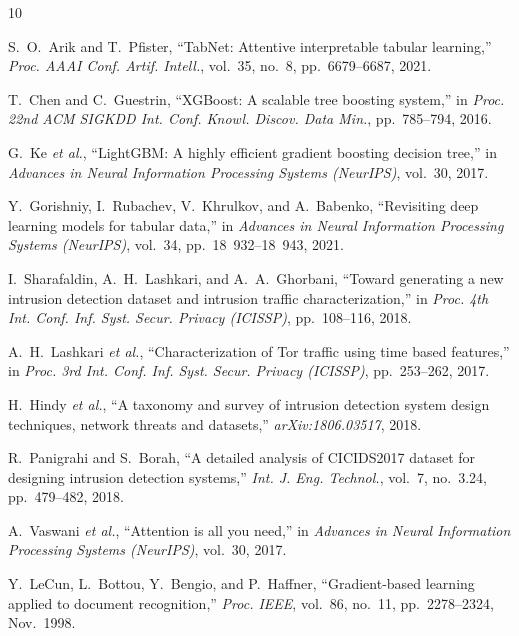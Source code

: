 \documentclass[conference]{IEEEtran}
\begin{document}
\balance
\begin{thebibliography}{10}

S.~O.~Arik and T.~Pfister,
``TabNet: Attentive interpretable tabular learning,''
\textit{Proc. AAAI Conf. Artif. Intell.}, vol.~35, no.~8,
pp.~6679--6687, 2021.

T.~Chen and C.~Guestrin,
``XGBoost: A scalable tree boosting system,''
in \textit{Proc. 22nd ACM SIGKDD Int. Conf. Knowl. Discov. Data Min.},
pp.~785--794, 2016.

G.~Ke \textit{et al.},
``LightGBM: A highly efficient gradient boosting decision tree,''
in \textit{Advances in Neural Information Processing Systems (NeurIPS)},
vol.~30, 2017.

Y.~Gorishniy, I.~Rubachev, V.~Khrulkov, and A.~Babenko,
``Revisiting deep learning models for tabular data,''
in \textit{Advances in Neural Information Processing Systems (NeurIPS)},
vol.~34, pp.~18~932--18~943, 2021.

I.~Sharafaldin, A.~H.~Lashkari, and A.~A.~Ghorbani,
``Toward generating a new intrusion detection dataset and intrusion traffic
characterization,''
in \textit{Proc. 4th Int. Conf. Inf. Syst. Secur. Privacy (ICISSP)},
pp.~108--116, 2018.

A.~H.~Lashkari \textit{et al.},
``Characterization of Tor traffic using time based features,''
in \textit{Proc. 3rd Int. Conf. Inf. Syst. Secur. Privacy (ICISSP)},
pp.~253--262, 2017.

H.~Hindy \textit{et al.},
``A taxonomy and survey of intrusion detection system design techniques,
network threats and datasets,''
\textit{arXiv:1806.03517}, 2018.

R.~Panigrahi and S.~Borah,
``A detailed analysis of CICIDS2017 dataset for designing intrusion detection
systems,''
\textit{Int. J. Eng. Technol.}, vol.~7, no.~3.24, pp.~479--482, 2018.

A.~Vaswani \textit{et al.},
``Attention is all you need,''
in \textit{Advances in Neural Information Processing Systems (NeurIPS)},
vol.~30, 2017.

Y.~LeCun, L.~Bottou, Y.~Bengio, and P.~Haffner,
``Gradient-based learning applied to document recognition,''
\textit{Proc. IEEE}, vol.~86, no.~11, pp.~2278--2324, Nov.~1998.

\end{thebibliography}
\end{document}
